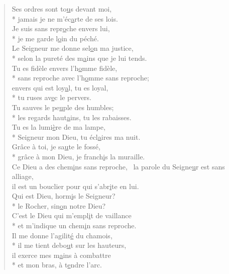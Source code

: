 \begin{verse}
Ses ordres sont to\underline{u}s devant moi, \\*
jamais je ne m’éc\underline{a}rte de ses lois. \\
Je suis sans repr\underline{o}che envers lui, \\*
je me garde l\underline{o}in du péché. \\
Le Seigneur me donne sel\underline{o}n ma justice, \\*
selon la pureté des m\underline{a}ins que je lui tends. \\

Tu es fidèle envers l’h\underline{o}mme fidèle, \\*
sans reproche avec l’h\underline{o}mme sans reproche; \\
envers qui est loy\underline{a}l, tu es loyal, \\*
tu ruses av\underline{e}c le pervers. \\

Tu sauves le pe\underline{u}ple des humbles; \\*
les regards haut\underline{a}ins, tu les rabaisses. \\
Tu es la lumi\underline{è}re de ma lampe, \\*
Seigneur mon Dieu, tu écl\underline{a}ires ma nuit. \\
Grâce à toi, je sa\underline{u}te le fossé, \\*
grâce à mon Dieu, je franch\underline{i}s la muraille. \\

Ce Dieu a des chem\underline{i}ns sans reproche,~\psalmdagger
la parole du Seigne\underline{u}r est sans alliage, \\
il est un bouclier pour qui s’abr\underline{i}te en lui. \\

Qui est Dieu, horm\underline{i}s le Seigneur? \\*
le Rocher, sin\underline{o}n notre Dieu? \\
C’est le Dieu qui m’empl\underline{i}t de vaillance \\*
et m’indique un chem\underline{i}n sans reproche. \\

Il me donne l’agilit\underline{é} du chamois, \\*
il me tient debo\underline{u}t sur les hauteurs, \\
il exerce mes m\underline{a}ins à combattre \\*
et mon bras, à t\underline{e}ndre l’arc. \\


\end{verse}
